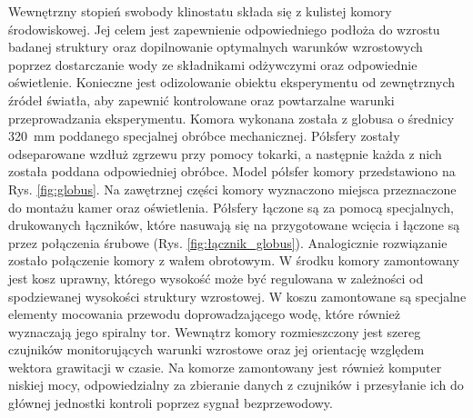Wewnętrzny stopień swobody klinostatu składa się z kulistej komory środowiskowej. Jej celem jest zapewnienie odpowiedniego podłoża do wzrostu badanej struktury oraz dopilnowanie optymalnych warunków wzrostowych poprzez dostarczanie wody ze składnikami odżywczymi oraz odpowiednie oświetlenie. Konieczne jest odizolowanie obiektu eksperymentu od zewnętrznych źródeł światła, aby zapewnić kontrolowane oraz powtarzalne warunki przeprowadzania eksperymentu. Komora wykonana została z globusa o średnicy \SI{320}{mm} poddanego specjalnej obróbce mechanicznej. Półsfery zostały odseparowane wzdłuż zgrzewu przy pomocy tokarki, a następnie każda z nich została poddana odpowiedniej obróbce. Model półsfer komory przedstawiono na Rys. \ref{fig:globus}. Na zawętrznej części komory wyznaczono miejsca przeznaczone do montażu kamer oraz oświetlenia. Półsfery łączone są za pomocą specjalnych, drukowanych łączników, które nasuwają się na przygotowane wcięcia i łączone są przez połączenia śrubowe (Rys. \ref{fig:łącznik_globus}). Analogicznie rozwiązanie zostało połączenie komory z wałem obrotowym. W środku komory zamontowany jest kosz uprawny, którego wysokość może być regulowana w zależności od spodziewanej wysokości struktury wzrostowej. W koszu zamontowane są specjalne elementy mocowania przewodu doprowadzającego wodę, które również wyznaczają jego spiralny tor. Wewnątrz komory rozmieszczony jest szereg czujników monitorujących warunki wzrostowe oraz jej orientację względem wektora grawitacji w czasie. Na komorze zamontowany jest również komputer niskiej mocy, odpowiedzialny za zbieranie danych z czujników i przesyłanie ich do głównej jednostki kontroli poprzez sygnał bezprzewodowy.

